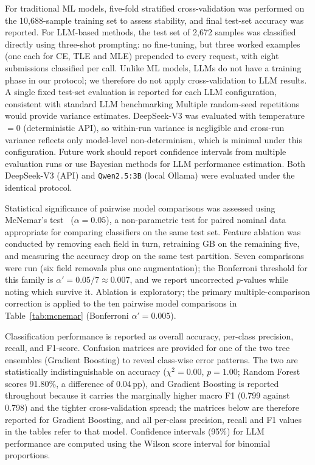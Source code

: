 \documentclass[acmsmall]{acmart}
\begin{document}
For traditional ML models, five-fold stratified cross-validation was performed
on the 10,688-sample training set to assess
stability, and final test-set accuracy was reported. For LLM-based methods, the test set of 2,672 samples was classified directly
using three-shot prompting: no fine-tuning, but three worked examples (one each for CE, TLE and MLE) prepended to every request, with eight submissions classified per call.
Unlike ML models, LLMs do not have a training phase in our protocol; we therefore
do not apply cross-validation to LLM results. A single fixed test-set evaluation
is reported for each LLM configuration, consistent with standard LLM benchmarking
Multiple random-seed repetitions would provide variance estimates. DeepSeek-V3 was evaluated with temperature$=0$ (deterministic API), so within-run variance is negligible and cross-run variance reflects only model-level non-determinism, which is minimal under this configuration. Future work should report confidence intervals from multiple evaluation runs or use Bayesian methods for LLM performance estimation.
Both DeepSeek-V3 (API) and \texttt{Qwen2.5:3B} (local Ollama) were evaluated under the
identical protocol.

Statistical significance of pairwise model comparisons was assessed using
McNemar's test~\cite{mcnemar1947note} ($\alpha = 0.05$), a non-parametric test
for paired nominal data appropriate for comparing classifiers on the same test
set. Feature ablation was conducted by removing each field in turn,
retraining GB on the remaining five, and measuring the accuracy drop on the same
test partition. Seven comparisons were run (six field removals plus one augmentation); the Bonferroni threshold for this family
is $\alpha' = 0.05/7 \approx 0.007$, and we report uncorrected $p$-values while
noting which survive it. Ablation is exploratory; the primary
multiple-comparison correction is applied to the ten pairwise model comparisons
in Table~\ref{tab:mcnemar} (Bonferroni $\alpha' = 0.005$).

Classification performance is reported as overall accuracy, per-class
precision, recall, and F1-score. Confusion matrices are provided for one of the
two tree ensembles (Gradient Boosting) to reveal class-wise error patterns. The
two are statistically indistinguishable on accuracy ($\chi^2=0.00$, $p=1.00$;
Random Forest scores 91.80\%, a difference of 0.04\,pp), and Gradient Boosting
is reported throughout because it carries the marginally higher macro F1
(0.799 against 0.798) and the tighter cross-validation spread; the matrices
below are therefore reported for Gradient Boosting, and all per-class
precision, recall and F1 values in the tables refer to that model. Confidence
intervals (95\%) for LLM performance are computed using the Wilson score
interval for binomial proportions.
\end{document}
